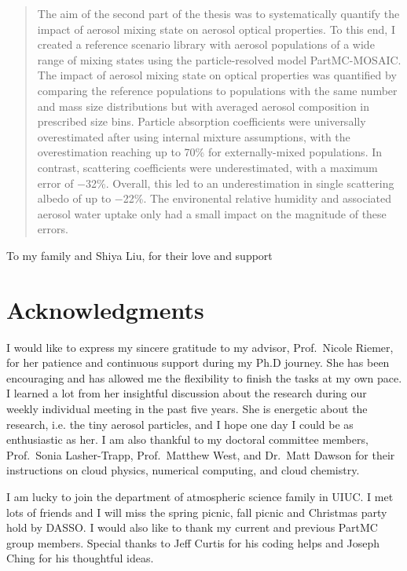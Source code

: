 \documentclass[edeposit,fullpage]{uiucthesis2009}
\begin{document}
\begin{abstract}
The aim of the second part of the thesis was to systematically
quantify the impact of aerosol mixing state on aerosol optical
properties. To this end, I created a reference scenario library with
aerosol populations of a wide range of mixing states using the
particle-resolved model PartMC-MOSAIC. The impact of aerosol mixing
state on optical properties was quantified by comparing the reference
populations to populations with the same number and mass size
distributions but with averaged aerosol composition in prescribed size
bins. Particle absorption coefficients were universally overestimated
after using internal mixture assumptions, with the overestimation
reaching up to 70\% for externally-mixed populations. In contrast,
scattering coefficients were underestimated, with a maximum error of
$-$32\%. Overall, this led to an underestimation in single scattering
albedo of up to $-$22\%. The environental relative humidity and
associated aerosol water uptake only had a small impact on the
magnitude of these errors.

\end{abstract}

\begin{dedication}
To my family and Shiya Liu, for their love and support
\end{dedication}

\chapter*{Acknowledgments}
I would like to express my sincere gratitude to my advisor, Prof.\ Nicole Riemer, 
for her patience and continuous support during my Ph.D journey. She has been encouraging and has allowed me the flexibility to finish the tasks at my  own pace. I learned a lot from her insightful discussion about the research during our weekly individual meeting in the past five years. She is energetic about the research, i.e. the tiny aerosol particles, and I hope one day I could be as enthusiastic as her. I am also thankful to my doctoral committee members, Prof.\ Sonia Lasher-Trapp, Prof.\ Matthew West, and Dr.\ Matt Dawson for their instructions on cloud physics, numerical computing, and cloud chemistry.  

I am lucky to join the department of atmospheric science family in UIUC. I met lots of friends and I will miss the spring picnic, fall picnic and Christmas party hold by DASSO. I would also like to thank my current and previous PartMC group members. Special thanks to Jeff Curtis for his coding helps and Joseph Ching for his thoughtful ideas. 
\end{document}
